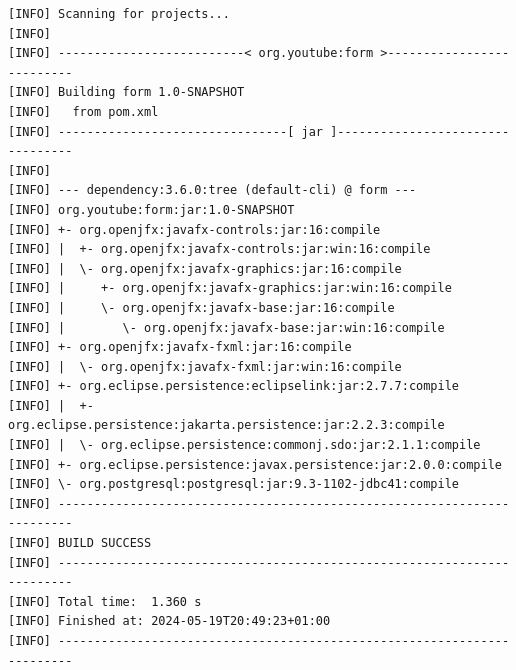 \documentclass[conference]{IEEEtran}
\begin{document}
\begin{lstlisting}[caption=Example Maven dependencies]
[INFO] Scanning for projects...
[INFO] 
[INFO] --------------------------< org.youtube:form >--------------------------
[INFO] Building form 1.0-SNAPSHOT
[INFO]   from pom.xml
[INFO] --------------------------------[ jar ]---------------------------------
[INFO] 
[INFO] --- dependency:3.6.0:tree (default-cli) @ form ---
[INFO] org.youtube:form:jar:1.0-SNAPSHOT
[INFO] +- org.openjfx:javafx-controls:jar:16:compile
[INFO] |  +- org.openjfx:javafx-controls:jar:win:16:compile
[INFO] |  \- org.openjfx:javafx-graphics:jar:16:compile
[INFO] |     +- org.openjfx:javafx-graphics:jar:win:16:compile
[INFO] |     \- org.openjfx:javafx-base:jar:16:compile
[INFO] |        \- org.openjfx:javafx-base:jar:win:16:compile
[INFO] +- org.openjfx:javafx-fxml:jar:16:compile
[INFO] |  \- org.openjfx:javafx-fxml:jar:win:16:compile
[INFO] +- org.eclipse.persistence:eclipselink:jar:2.7.7:compile
[INFO] |  +- org.eclipse.persistence:jakarta.persistence:jar:2.2.3:compile
[INFO] |  \- org.eclipse.persistence:commonj.sdo:jar:2.1.1:compile
[INFO] +- org.eclipse.persistence:javax.persistence:jar:2.0.0:compile
[INFO] \- org.postgresql:postgresql:jar:9.3-1102-jdbc41:compile
[INFO] ------------------------------------------------------------------------
[INFO] BUILD SUCCESS
[INFO] ------------------------------------------------------------------------
[INFO] Total time:  1.360 s
[INFO] Finished at: 2024-05-19T20:49:23+01:00
[INFO] ------------------------------------------------------------------------


\end{lstlisting}


\ifCLASSOPTIONcaptionsoff
  \newpage
\fi
\end{document}
